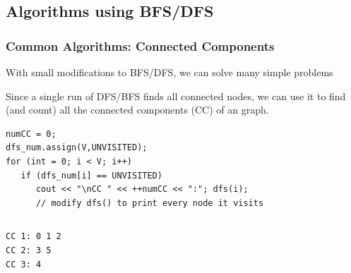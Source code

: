 \documentclass{beamer}
\begin{document}
\subsection{Algorithms using BFS/DFS}
\begin{frame}[fragile]
  \frametitle{Common Algorithms: Connected Components}
  {\smaller
    \begin{block}{}
      With small modifications to BFS/DFS, we can solve many simple problems
    \end{block}

    Since a single run of DFS/BFS finds all connected nodes, we can
    use it to find (and count) all the connected components (CC) of an
     graph.

    \begin{exampleblock}{}
\begin{verbatim}
numCC = 0;
dfs_num.assign(V,UNVISITED);
for (int = 0; i < V; i++)
   if (dfs_num[i] == UNVISITED)
      cout << "\nCC " << ++numCC << ":"; dfs(i);
      // modify dfs() to print every node it visits
\end{verbatim}
    \end{exampleblock}}

\begin{columns}
  \hfill
\begin{verbatim}
CC 1: 0 1 2
CC 2: 3 5
CC 3: 4
\end{verbatim}
\end{columns}
\end{frame}
\end{document}
